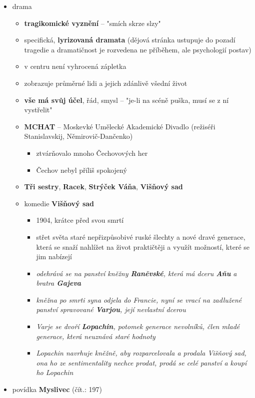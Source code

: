 \begin{itemize}
\begin{itemize}
	\end{itemize}
\item drama
	\begin{itemize}
	\item \textbf{tragikomické vyznění} -- "smích skrze slzy"
	\item specifická, \textbf{lyrizovaná dramata} (dějová stránka ustupuje do pozadí tragedie a dramatičnost je rozvedena ne příběhem, ale psychologií postav)
	\item v centru není vyhrocená zápletka 
	\item zobrazuje průměrné lidi a jejich zdánlivě všední život
	\item \textbf{vše má svůj účel}, řád, smysl -- "je-li na scéně puška, musí se z ní vystřelit"
	\item \textbf{MCHAT} -- Moskevké Umělecké Akademické Divadlo (režiséři Stanislavskij, Němirovič-Dančenko)
		\begin{itemize}
		\item ztvárňovalo mnoho Čechovových her
		\item Čechov nebyl příliš spokojený
		\end{itemize}
	\item \textbf{Tři sestry}, \textbf{Racek}, \textbf{Strýček Váňa}, \textbf{Višňový sad}
	\item komedie \textbf{Višňový sad}
		\begin{itemize}
		\item 1904, krátce před svou smrtí
		\item střet světa staré nepřizpůsobivé ruské šlechty a nové dravé generace, která se snaží nahlížet na život praktičtěji a využít možností, které se jim nabízejí
		\item \textit{odehrává se na panství kněžny \textbf{Raněvské}, která má dceru \textbf{Aňu} a bratra \textbf{Gajeva}}
		\item \textit{kněžna po smrti syna odjela do Francie, nyní se vrací na zadlužené panství spravované \textbf{Varjou}, její nevlastní dcerou}
		\item \textit{Varje se dvoří \textbf{Lopachin}, potomek generace nevolníků, člen mladé generace, která neuznává staré hodnoty }
		\item \textit{Lopachin navrhuje kněžně, aby rozparcelovala a prodala Višňový sad, ona ho ze sentimentality nechce prodat, prodá se celé panství a koupí ho Lopachin}
		\end{itemize}
	\end{itemize}
\item povídka \textbf{Myslivec} (čít.: 197)
\end{itemize}



